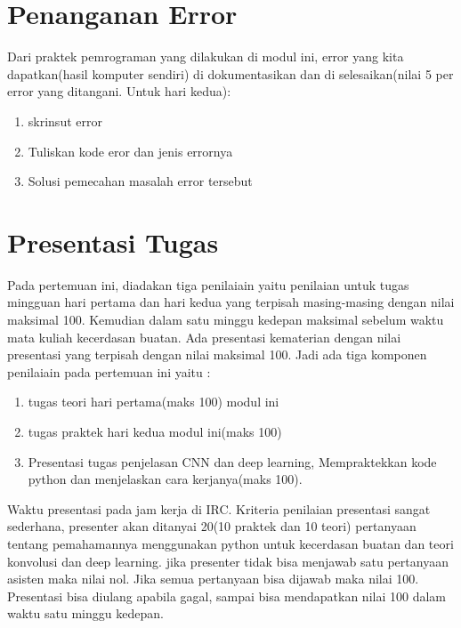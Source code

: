 \section{Penanganan Error}
Dari praktek pemrograman yang dilakukan di modul ini, error yang kita dapatkan(hasil komputer sendiri) di dokumentasikan dan di selesaikan(nilai 5 per error yang ditangani. Untuk hari kedua):

\begin{enumerate}
	\item skrinsut error
	\item Tuliskan kode eror dan jenis errornya
	\item Solusi pemecahan masalah error tersebut
\end{enumerate}

\section{Presentasi Tugas}
Pada pertemuan ini, diadakan tiga penilaiain yaitu penilaian untuk tugas mingguan hari pertama dan hari kedua yang terpisah masing-masing dengan nilai maksimal 100. Kemudian dalam satu minggu kedepan maksimal sebelum waktu mata kuliah kecerdasan buatan. Ada presentasi kematerian dengan nilai presentasi yang terpisah dengan nilai maksimal 100. Jadi ada tiga komponen penilaiain pada pertemuan ini yaitu :
\begin{enumerate}
	\item tugas teori hari pertama(maks 100) modul ini
	\item tugas praktek hari kedua modul ini(maks 100)
	\item Presentasi tugas penjelasan CNN dan deep learning, Mempraktekkan kode python dan menjelaskan cara kerjanya(maks 100).
\end{enumerate}
Waktu presentasi pada jam kerja di IRC. Kriteria penilaian presentasi sangat sederhana, presenter akan ditanyai 20(10 praktek dan 10 teori) pertanyaan tentang pemahamannya menggunakan python untuk kecerdasan buatan dan teori konvolusi dan deep learning. jika presenter tidak bisa menjawab satu pertanyaan asisten maka nilai nol. Jika semua pertanyaan bisa dijawab maka nilai 100. Presentasi bisa diulang apabila gagal, sampai bisa mendapatkan nilai 100 dalam waktu satu minggu kedepan.


